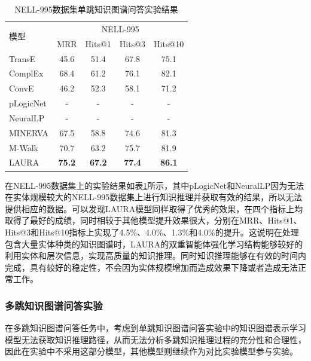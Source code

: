 \documentclass[algorithmlist, AutoFakeBold, AutoFakeSlant, figurelist, tablelist, nomlist, engineering]{seuthesix}
\begin{document}
\begin{table}[t]
  \centering
  \caption{NELL-995数据集单跳知识图谱问答实验结果}
  \begin{tabular*}{0.95\textwidth}{@{\extracolsep{\fill}}lcccc}
    \toprule[1pt]
    \multirow{2}{*}{模型} & \multicolumn{4}{c}{NELL-995} \\
      & MRR & Hits@1 & Hits@3 & Hits@10 \\ \hline
    TransE & 45.6 & 51.4 & 67.8 & 75.1 \\
    ComplEx & 68.4 & 61.2 & 76.1 & 82.1 \\
    ConvE & 46.2 & 52.3 & 58.1 & 71.2 \\
    pLogicNet & - & - & - & - \\
    NeuralLP & - & - & - & - \\
    MINERVA & 67.5 & 58.8 & 74.6 & 81.3 \\
    M-Walk & 70.7 & 63.2 & 75.7 & 81.9 \\
    LAURA & \textbf{75.2} & \textbf{67.2} & \textbf{77.4} & \textbf{86.1} \\
    \bottomrule[1pt]
  \end{tabular*}
  \label{Experiment2_NELL-995}
\end{table}
在NELL-995数据集上的实验结果如表\ref{Experiment2_NELL-995}所示，其中pLogicNet和NeuralLP因为无法在实体规模较大的NELL-995数据集上进行知识推理并获取有效的结果，所以无法提供相应的数据。可以发现LAURA模型同样取得了优秀的效果，在四个指标上均取得了最好的成绩，同时相较于其他模型提升效果很大，分别在MRR、Hits@1、Hits@3和Hits@10指标上实现了4.5\%、4.0\%、1.3\%和4.0\%的提升。这说明在处理包含大量实体种类的知识图谱时，LAURA的双重智能体强化学习结构能够较好的利用实体和层次信息，实现高质量的知识推理。同时知识推理能够在有效的时间内完成，具有较好的稳定性，不会因为实体规模增加而造成效果下降或者造成无法正常工作。

\subsubsection{多跳知识图谱问答实验}
在多跳知识图谱问答任务中，考虑到单跳知识图谱问答实验中的知识图谱表示学习模型无法获取知识推理路径，从而无法分析多跳知识推理过程的充分性和合理性，因此在实验中不采用这部分模型，其他模型则继续作为对比实验模型参与实验。
\end{document}

